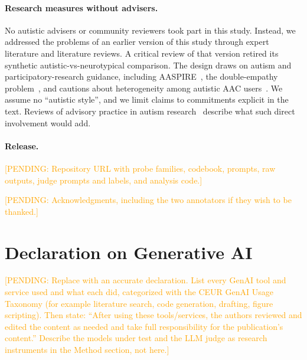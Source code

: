 \documentclass{ceurart}
\newcommand{\pending}[1]{\textcolor{orange}{[PENDING: #1]}}
\begin{document}
\paragraph{Research measures without advisers.}
No autistic advisers or community reviewers took part in this study.
Instead, we addressed the problems of an earlier version of this study through expert literature and literature reviews.
A critical review of that version retired its synthetic autistic-vs-neurotypical comparison.
The design draws on autism and participatory-research guidance, including AASPIRE~\cite{nicolaidis2019aaspire}, the double-empathy problem~\cite{milton2012double}, and cautions about heterogeneity among autistic AAC users~\cite{zisk2019aac,frisch2025autistic}.
We assume no ``autistic style'', and we limit claims to commitments explicit in the text.
Reviews of advisory practice in autism research~\cite{jansevanrensburg2026advisory} describe what such direct involvement would add.

\paragraph{Release.}
\pending{Repository URL with probe families, codebook, prompts, raw outputs, judge prompts and labels, and analysis code.}

\begin{acknowledgments}
\pending{Acknowledgments, including the two annotators if they wish to be thanked.}
\end{acknowledgments}

\section*{Declaration on Generative AI}
\pending{Replace with an accurate declaration. List every GenAI tool and service used and what each did, categorized with the CEUR GenAI Usage Taxonomy (for example literature search, code generation, drafting, figure scripting). Then state: ``After using these tools/services, the authors reviewed and edited the content as needed and take full responsibility for the publication's content.'' Describe the models under test and the LLM judge as research instruments in the Method section, not here.}


\end{document}

